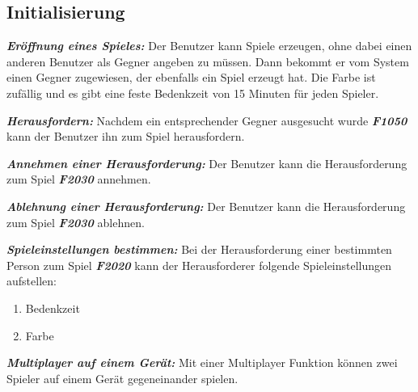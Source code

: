 \documentclass[parskip=full]{scrartcl}
\begin{document}
\subsection{Initialisierung}
\begin{description}
	\hypertarget{F2010}{\item[F2010]}\textbf{\textit{Eröffnung eines Spieles: }} Der Benutzer kann Spiele erzeugen, ohne dabei einen anderen Benutzer als Gegner angeben zu müssen. Dann bekommt er vom System einen Gegner zugewiesen, der ebenfalls ein Spiel erzeugt hat. Die Farbe ist zufällig und es gibt eine feste Bedenkzeit von 15 Minuten für jeden Spieler.
	
	\item[F2020] \textbf{\textit{Herausfordern: }} Nachdem ein entsprechender Gegner ausgesucht wurde \textbf{\textit{F1050}} kann der Benutzer ihn zum Spiel herausfordern.
	\item [F2030] \textbf{\textit{Annehmen einer Herausforderung: }} Der Benutzer kann die Herausforderung zum Spiel \textbf{\textit{F2030}} annehmen.
	\item [F2040] \textbf{\textit{Ablehnung einer Herausforderung: }} Der Benutzer kann die Herausforderung zum Spiel \textbf{\textit{F2030}} ablehnen.
	
	\item[F2050] \textbf{\textit{Spieleinstellungen bestimmen: }} Bei der Herausforderung einer bestimmten Person zum Spiel \textbf{\textit{F2020}} kann der Herausforderer folgende Spieleinstellungen aufstellen:
	\begin{enumerate}
		\item Bedenkzeit
		\item Farbe
	\end{enumerate}
	\item[F2060] \textbf{\textit{Multiplayer auf einem Gerät: }}  Mit einer Multiplayer Funktion können zwei Spieler auf einem Gerät gegeneinander spielen.
	
	
\end{description}
\end{document}
